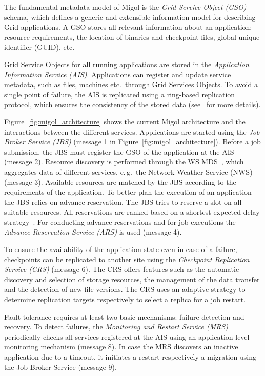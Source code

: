 \documentclass[times, 10pt,twocolumn]{article}
\begin{document}
The fundamental metadata model of Migol is the \emph{Grid Service Object (GSO)} schema,
which defines a generic and extensible information model for
describing Grid applications.  
A GSO stores all relevant information about an application: resource requirements,
the location of binaries and checkpoint files, global unique identifier (GUID),
etc.

Grid Service Objects for all running applications are stored in 
the {\em Application Information Service (AIS)}. 
Applications can register and update service metadata, 
such as files, machines etc.\ through Grid Services Objects. 
To avoid a single point of failure, the AIS is replicated using a ring-based
replication protocol, which ensures  the consistency of the stored data
(see~\cite{Luckow:2008ys} for more details).

Figure~\ref{fig:migol_architecture} shows the current Migol architecture and
the interactions between the different services.  Applications are
started using the {\em Job Broker Service (JBS)} (message 1 in 
Figure~\ref{fig:migol_architecture}). Before a job
submission, the JBS must register the GSO of the application at the AIS (message 2).
Resource discovery is performed through the WS MDS~\cite{schopf06},
which aggregates data of different services, e.\,g.\ the Network
Weather Service (NWS)~\cite{NWS99} (message 3).  Available resources are matched
by the JBS according to the requirements of the application. To better plan the execution of 
an application the JBS relies on advance reservation. The JBS tries to reserve a slot on all suitable
resources. All reservations are ranked based on a shortest expected
delay strategy~\cite{Jeske:2007wj}.  For conducting advance reservations and for job executions the
\emph{Advance Reservation Service (ARS)} is used (message 4).
             
To ensure the availability of the application state even in case of a failure, 
checkpoints can be replicated to another site  using the \emph{Checkpoint Replication Service
(CRS)} (message 6).  The CRS offers features such as the automatic discovery and selection of storage resources, 
the management of the data transfer and the detection of new file versions. 
The CRS uses an adaptive strategy to determine replication  targets respectively to select a replica for a
job restart.


Fault tolerance requires at least two basic mechanisms: failure
detection and recovery. To detect failures, the \emph{Monitoring and Restart Service (MRS)}
periodically checks all services registered at the AIS using an
application-level monitoring mechanism (message 8). In case the MRS discovers an inactive
application due to a timeout, it initiates a restart respectively a migration using the
Job Broker Service (message 9).  
          
\end{document}
